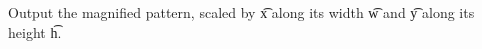 Output the magnified pattern, scaled by \t{x} along its width \t{w} and \t{y} along its height \t{h}.
